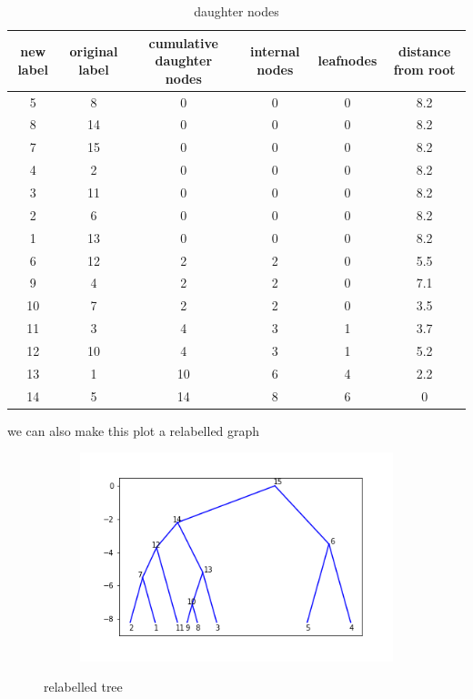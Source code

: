 \documentclass{article}
\begin{document}
\begin{table}[h]
\centering
\begin{tabular}{ |c|c|c|c|c|c|}
\hline
 new label & original label & cumulative daughter nodes & internal nodes & leafnodes & distance from root \\
\hline
5 & 8 & 0 & 0 & 0 & 8.2 \\
8 & 14 & 0 & 0 & 0 & 8.2 \\
7 & 15 & 0 & 0 & 0 & 8.2 \\
4 & 2 & 0 & 0 & 0 & 8.2 \\
3 & 11 & 0 & 0 & 0 & 8.2 \\
2 & 6 & 0 & 0 & 0 & 8.2 \\
1 & 13 & 0 & 0 & 0 & 8.2 \\
\hline
6 & 12 & 2 & 2 & 0 & 5.5 \\
9 & 4 & 2 & 2 & 0 & 7.1 \\
10 & 7 & 2 & 2 & 0 & 3.5 \\
11 & 3 & 4 & 3 & 1 & 3.7 \\
12 & 10 & 4 & 3 & 1 & 5.2 \\
13 & 1 & 10 & 6 & 4 & 2.2 \\
14 & 5 & 14 & 8 & 6 & 0 \\
\hline
\end{tabular}
\caption{daughter nodes}
\label{tab:treesum}
\end{table}


we can also make this plot a relabelled graph

\begin{figure}[h]
	\centering
	\begin{subfigure}[t]{0.63\linewidth}
		\centering
		\includegraphics[width = 1.0\linewidth, trim={0 0 0 0}, clip=true]{figures/tree_relabelled.png}
	\end{subfigure}
\caption{relabelled tree}
\label{fig:tree_relab}
\end{figure}
\end{document}
